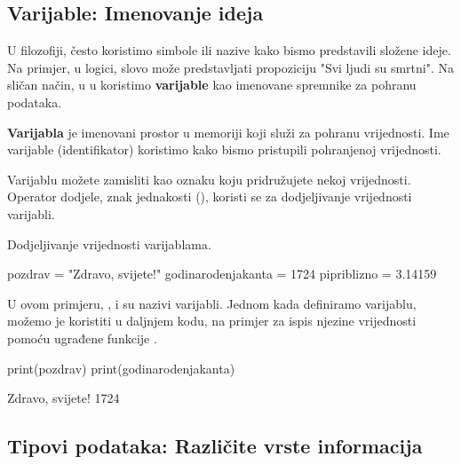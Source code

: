 \subsection{Varijable: Imenovanje ideja}

U filozofiji, često koristimo simbole ili nazive kako bismo predstavili složene ideje. Na primjer, u logici, slovo  može predstavljati propoziciju "Svi ljudi su smrtni". Na sličan način, u u koristimo \textbf{varijable} kao imenovane spremnike za pohranu podataka.

\begin{definicijaokvir}
    \textbf{Varijabla} je imenovani prostor u memoriji koji služi za pohranu vrijednosti. Ime varijable (identifikator) koristimo kako bismo pristupili pohranjenoj vrijednosti.
\end{definicijaokvir}

Varijablu možete zamisliti kao oznaku koju pridružujete nekoj vrijednosti. Operator dodjele, znak jednakosti (\pyinline{=}), koristi se za dodjeljivanje vrijednosti varijabli.

\begin{primjerokvir}
    Dodjeljivanje vrijednosti varijablama.
    \begin{pythoncode}
pozdrav = "Zdravo, svijete!"
godinarodenjakanta = 1724
pipriblizno = 3.14159
    \end{pythoncode}
    U ovom primjeru, ,  i  su nazivi varijabli. Jednom kada definiramo varijablu, možemo je koristiti u daljnjem kodu, na primjer za ispis njezine vrijednosti pomoću ugrađene funkcije .
    \begin{pythoncode}
print(pozdrav)
print(godinarodenjakanta)
    \end{pythoncode}
    \begin{codeoutput}
Zdravo, svijete!
1724
    \end{codeoutput}
\end{primjerokvir}


\subsection{Tipovi podataka: Različite vrste informacija}

